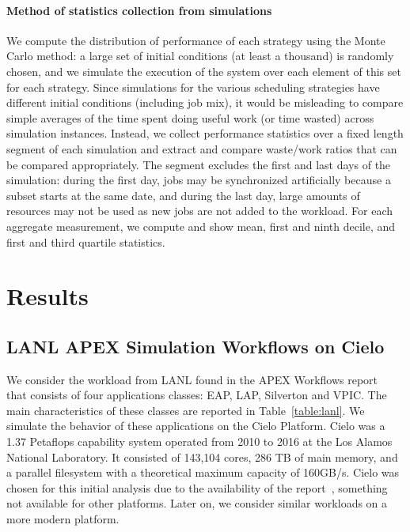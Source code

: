 \documentclass[conference,nofonttune]{IEEEtran}
\begin{document}
\paragraph*{Method of statistics collection from simulations}
We compute the distribution of performance of each strategy using the
Monte Carlo method: a large set of initial conditions (at least a
thousand) is randomly chosen, and we simulate the execution of the
system over each element of this set for each strategy. Since
simulations for the various scheduling strategies have different
initial conditions (including job mix), it would be misleading to
compare simple averages of the time spent doing useful work (or time
wasted) across simulation instances. Instead, we collect performance
statistics over a fixed length segment of each simulation and extract
and compare waste/work ratios that can be compared appropriately. The
segment excludes the first and last days of the simulation: during the
first day, jobs may be synchronized artificially because a subset
starts at the same date, and during the last day, large amounts of
resources may not be used as new jobs are not added to the workload.
For each aggregate measurement, we compute and show mean, first and
ninth decile, and first and third quartile statistics.

%

\section{Results}\label{sec:results}

\subsection{LANL APEX Simulation Workflows on Cielo}

We consider the workload from LANL found in the APEX Workflows
report~\cite{apex2016} that consists of four applications classes: EAP, LAP,
Silverton and VPIC. The main characteristics of these classes are reported in
Table~\ref{table:lanl}. We simulate the behavior of these applications on the
Cielo Platform. Cielo was a 1.37 Petaflops capability system operated from 2010
to 2016 at the Los Alamos National Laboratory.  It consisted of 143,104 cores,
286 TB of main memory, and a parallel filesystem with a theoretical maximum
capacity of 160GB/s.  Cielo was chosen for this initial analysis due to the
availability of the report~\cite{apex2016}, something not available for
other platforms. Later on, we consider similar workloads on a more
modern platform.
\end{document}
